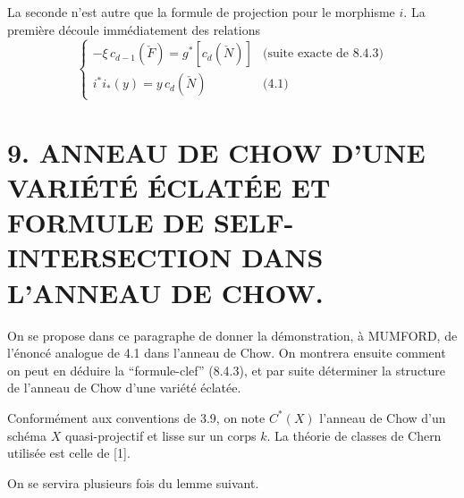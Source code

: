 La seconde n'est autre que la formule de projection pour le morphisme $i$. La première découle immédiatement des relations
\[
\begin{cases}
-\xi\,c_{d-1}(\check F)=g^*[c_d(\check N)]&\text{(suite exacte de 8.4.3)}\\
i^*i_*(y)=y\,c_d(\check N)&\text{(4.1)}
\end{cases}
\]

\section*{9. ANNEAU DE CHOW D'UNE VARIÉTÉ ÉCLATÉE ET FORMULE DE SELF-INTERSECTION DANS L'ANNEAU DE CHOW.}

On se propose dans ce paragraphe de donner la démonstration,  à MUMFORD, de l'énoncé analogue de 4.1 dans l'anneau de Chow. On montrera ensuite comment on peut en déduire la ``formule-clef'' (8.4.3), et par suite déterminer la structure de l'anneau de Chow d'une variété éclatée.

Conformément aux conventions de 3.9, on note $C^*(X)$ l'anneau de Chow d'un schéma $X$ quasi-projectif et lisse sur un corps $k$. La théorie de classes de Chern utilisée est celle de [1].

On se servira plusieurs fois du lemme suivant.

